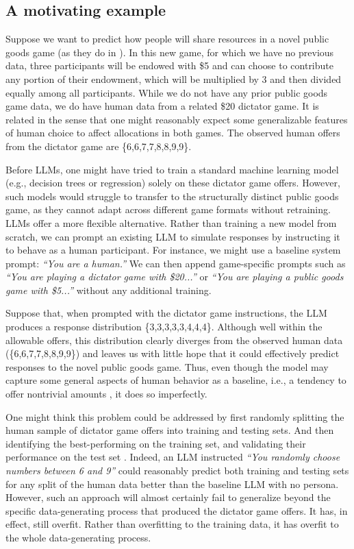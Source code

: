 \subsection{A motivating example}

Suppose we want to predict how people will share resources in a novel public goods game (as they do in \cite{alsobay2025integrative}).
In this new game, for which we have no previous data, three participants will be endowed with \$5 and can choose to contribute any portion of their endowment, which will be multiplied by 3 and then divided equally among all participants.
While we do not have any prior public goods game data, we do have human data from a related \$20 dictator game.
It is related in the sense that one might reasonably expect some generalizable features of human choice to affect allocations in both games.
The observed human offers from the dictator game are \{6,6,7,7,8,8,9,9\}.

Before LLMs, one might have tried to train a standard machine learning model (e.g., decision trees or regression) solely on these dictator game offers.
However, such models would struggle to transfer to the structurally distinct public goods game, as they cannot adapt across different game formats without retraining.
LLMs offer a more flexible alternative. 
Rather than training a new model from scratch, we can prompt 
an existing LLM to simulate responses by instructing it to behave as a human participant.
For instance, we might use a baseline system prompt: \emph{``You are a human.''}
We can then append game-specific prompts such as \emph{``You are playing a dictator game with \$20...''} or \emph{``You are playing a public goods game with \$5...''} without any additional training.

Suppose that, when prompted with the dictator game instructions, the LLM produces a response distribution \{3,3,3,3,3,4,4,4\}.
Although well within the allowable offers, this distribution clearly diverges from the observed human data  (\{6,6,7,7,8,8,9,9\}) and leaves us with little hope that it could effectively predict responses to the novel public goods game.
Thus, even though the model may capture some general aspects of human behavior as a baseline, i.e., a tendency to offer nontrivial amounts \citep{Henrich2001InSearch}, it does so imperfectly.

One might think this problem could be addressed by first randomly splitting the human sample of dictator game offers into training and testing sets.
And then identifying the best-performing  on the training set, and validating their performance on the test set \citep{ML2017Sendhil,ludwig2025llmapplied}.
Indeed, an LLM instructed \emph{``You randomly choose numbers between 6 and 9''} could reasonably predict both training and testing sets for any split of the human data better than the baseline LLM with no persona.
However, such an approach will almost certainly fail to generalize beyond the specific data-generating process that produced the dictator game offers.
It has, in effect, still overfit.
Rather than overfitting to the training data, it has overfit to the whole data-generating process.

